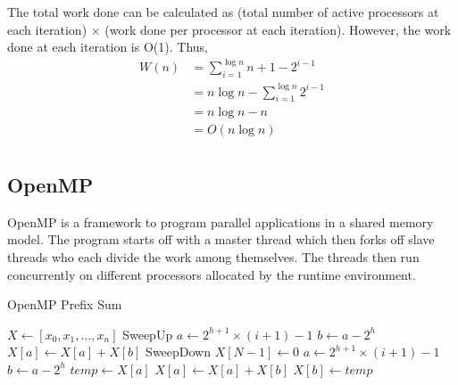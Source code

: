 \documentclass[11pt]{article}
\begin{document}
\noindent The total work done can be calculated as (total number of active processors at each iteration) $\times$ (work done per processor at each iteration). However, the work done at each iteration is O(1). Thus, 
\begin{align*} 
W(n) &= \sum\limits_{i=1}^{\log n} n + 1 - 2^{i - 1}  \\ 
&= n{\log n} - \sum\limits_{i=1}^{\log n} 2^{i - 1}  \\
&= n{\log n} - n  \\
&= O(n\log n)  \\
\end{align*}

\subsection{OpenMP}
OpenMP is a framework to program parallel applications in a shared memory model. The program starts off with a master thread which then forks off slave threads who each divide the work among themselves. The threads then run concurrently on different processors allocated by the runtime environment.

\begin{algorithm}
\caption{OpenMP Prefix Sum}
\label{alg3}
\begin{algorithmic}[1]
  \State $X \leftarrow [x_{0}, x_{1}, \ldots, x_{n}]$
  \State \Comment SweepUp
        \State $a \leftarrow 2^{h+1} \times (i+1) - 1$
        \State $b \leftarrow a - 2^{h}$
        \State $X[a] \leftarrow X[a] + X[b]$
      \EndFor
    \EndFor
    \State
    \State \Comment SweepDown
    \State $X[N-1] \leftarrow 0$
        \State $a \leftarrow 2^{h+1} \times (i+1) - 1$
        \State $b \leftarrow a - 2^{h}$
        \State $temp \leftarrow X[a]$
        \State $X[a] \leftarrow X[a] + X[b]$
        \State $X[b] \leftarrow temp$
      \EndFor
    \EndFor

\end{algorithmic}
\end{algorithm}
\end{document}
